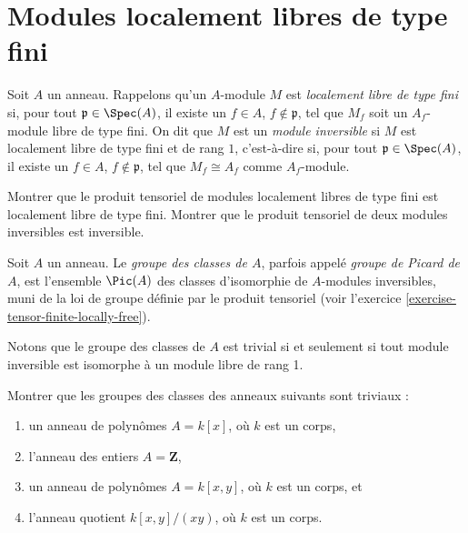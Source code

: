 \section{Modules localement libres de type fini}
\label{section-finite-locally-free}

\begin{definition}
\label{definition-finite-locally-free}
Soit $A$ un anneau. Rappelons qu'un $A$-module $M$ est
{\it localement libre de type fini} si, pour tout ${\mathfrak p} \in \Spec(A)$,
il existe un
$f\in A$, $f \not \in {\mathfrak p}$, tel que $M_f$ soit un $A_f$-module libre
de type fini. On dit que $M$ est un {\it module inversible} si
$M$ est localement libre de type fini et de rang $1$, c'est-à-dire si, pour tout
${\mathfrak p} \in \Spec(A)$, il existe un
$f\in A$, $f \not \in \mathfrak p$, tel que $M_f \cong A_f$
comme $A_f$-module.
\end{definition}

\begin{exercise}
\label{exercise-tensor-finite-locally-free}
Montrer que le produit tensoriel de modules localement libres de type fini
est localement libre de type fini. Montrer que le produit tensoriel de deux
modules inversibles est inversible.
\end{exercise}

\begin{definition}
\label{definition-class-group}
Soit $A$ un anneau. Le {\it groupe des classes de $A$}, parfois appelé
{\it groupe de Picard de $A$}, est l'ensemble $\Pic(A)$
des classes d'isomorphie de $A$-modules inversibles, muni
de la loi de groupe définie par le produit tensoriel (voir
l'exercice \ref{exercise-tensor-finite-locally-free}).
\end{definition}

\noindent
Notons que le groupe des classes de $A$ est trivial si et seulement si tout module
inversible est isomorphe à un module libre de rang 1.

\begin{exercise}
\label{exercise-class-group-trivial}
Montrer que les groupes des classes des anneaux suivants sont triviaux :
\begin{enumerate}
\item un anneau de polynômes $A = k[x]$, où $k$ est un corps,
\item l'anneau des entiers $A = \mathbf{Z}$,
\item un anneau de polynômes $A = k[x, y]$, où $k$ est un corps, et
\item l'anneau quotient $k[x, y]/(xy)$, où $k$ est un corps.
\end{enumerate}
\end{exercise}

